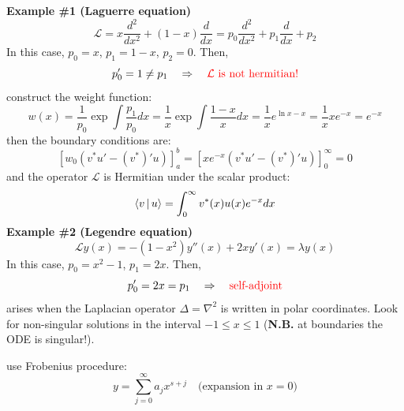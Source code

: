\documentclass{article}
\begin{document}
\noindent
\textbf{Example \#1 (Laguerre equation)}
\begin{equation}
    \mathcal{L} = x \frac{d^2}{dx^2} + (1 - x) \frac{d}{dx}
= p_0 \frac{d^2}{dx^2} + p_1 \frac{d}{dx} + p_2
\end{equation}
In this case, $p_0 = x$, $p_1 = 1-x$, $p_2 = 0$. Then,
\begin{equation}
    p_0' = 1 \neq p_1 \quad \Rightarrow \quad \color{red} \text{$\mathcal{L}$ is not hermitian!} \color{black}
\end{equation}
construct the weight function:
\begin{equation}
    w(x) = \frac{1}{p_0} \exp{\int\frac{p_1}{p_0}dx} = \frac{1}{x} \exp{\int \frac{1-x}{x}dx } = \frac{1}{x} e^{\ln x - x}
= \frac{1}{x} x e^{-x}= e^{-x}
\end{equation}
then the boundary conditions are:
\begin{equation}
    \left[ w_0 \left( v^{*} u' - (v^{*})' u \right) \right]_{a}^{b}
= \left[ x e^{-x} \left( v^{*} u' - (v^{*})' u \right) \right]_{0}^{\infty} = 0
\end{equation}
and the operator $\mathcal{L}$ is Hermitian under the scalar product:
\begin{equation}
    \Braket{v|u} = \int_0 ^\infty v^* (x) u(x) e^{-x} dx
\end{equation}
\noindent
\textbf{Example \#2 (Legendre equation)}
\begin{equation}
    \mathcal{L} y(x) = -(1-x^2) y''(x) + 2xy'(x) = \lambda y(x)
\end{equation}
In this case, $p_0 = x^2-1$, $p_1 = 2x$. Then,
\begin{equation}
    p_0' = 2x = p_1 \quad \Rightarrow \quad \color{red} \text{self-adjoint} \color{black}
\end{equation}
arises when the Laplacian operator $\Delta = \nabla^2$ is written in polar coordinates. Look for non-singular solutions in the interval $-1 \leq x \leq 1$ (\textbf{N.B.} at boundaries the ODE is singular!).

\noindent
use Frobenius procedure:
\begin{equation}
    y = \sum_{j=0}^\infty a_j x^{s+j} \quad \text{(expansion in $x=0$)}
\end{equation}
\end{document}
